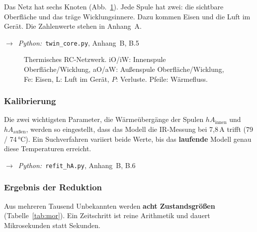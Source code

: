 \documentclass[a4paper, 10pt, conference]{ieeeconf}
\newcommand{\py}[1]{\par{\raggedright\noindent$\rightarrow$~\textit{Python:}~#1\par}\smallskip}
\begin{document}
Das Netz hat sechs Knoten (Abb.~\ref{fig:rc}). Jede Spule hat zwei: die
sichtbare Oberfläche und das träge Wicklungsinnere. Dazu kommen Eisen und
die Luft im Gerät. Die Zahlenwerte stehen in Anhang~A.
\py{\texttt{twin\_core.py}, Anhang~B, B.5}

\begin{figure}[t]
\centering
{}
\caption{Thermisches RC-Netzwerk. iO/iW: Innenspule Oberfläche/Wicklung,
aO/aW: Außenspule Oberfläche/Wicklung, Fe: Eisen, L: Luft im Gerät,
$P$: Verluste. Pfeile: Wärmefluss.}
\label{fig:rc}
\end{figure}

\subsubsection{Kalibrierung}
\label{sec:calib}
Die zwei wichtigsten Parameter, die Wärmeübergänge der Spulen
$hA_{\text{innen}}$ und $hA_{\text{außen}}$, werden so eingestellt, dass
das Modell die IR-Messung bei 7,8\,A trifft (79 / 74\,°C). Ein
Suchverfahren variiert beide Werte, bis das \textbf{laufende} Modell genau
diese Temperaturen erreicht.
\py{\texttt{refit\_hA.py}, Anhang~B, B.6}

\subsubsection{Ergebnis der Reduktion}
Aus mehreren Tausend Unbekannten werden \textbf{acht Zustandsgrößen}
(Tabelle~\ref{tab:mor}). Ein Zeitschritt ist reine Arithmetik und dauert
Mikrosekunden statt Sekunden.
\end{document}
